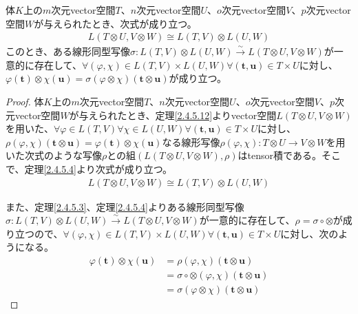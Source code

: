 \documentclass[dvipdfmx]{jsarticle}
\begin{document}
\begin{thm}\label{2.4.5.13}
体$K$上の$m$次元vector空間$T$、$n$次元vector空間$U$、$o$次元vector空間$V$、$p$次元vector空間$W$が与えられたとき、次式が成り立つ。
\begin{align*}
L(T \otimes U,V \otimes W) \cong L(T,V) \otimes L(U,W)
\end{align*}
このとき、ある線形同型写像$\sigma:L(T,V) \otimes L(U,W)\overset{\sim}{\rightarrow}L(T \otimes U,V \otimes W)$が一意的に存在して、$\forall(\varphi,\chi) \in L(T,V) \times L(U,W)\forall\left( \mathbf{t},\mathbf{u} \right) \in T \times U$に対し、$\varphi\left( \mathbf{t} \right) \otimes \chi\left( \mathbf{u} \right) = \sigma(\varphi \otimes \chi)\left( \mathbf{t} \otimes \mathbf{u} \right)$が成り立つ。
\end{thm}
\begin{proof}
体$K$上の$m$次元vector空間$T$、$n$次元vector空間$U$、$o$次元vector空間$V$、$p$次元vector空間$W$が与えられたとき、定理\ref{2.4.5.12}よりvector空間$L(T \otimes U,V \otimes W)$を用いた、$\forall\varphi \in L(T,V)\forall\chi \in L(U,W)\forall\left( \mathbf{t},\mathbf{u} \right) \in T \times U$に対し、$\rho(\varphi,\chi)\left( \mathbf{t} \otimes \mathbf{u} \right) = \varphi\left( \mathbf{t} \right) \otimes \chi\left( \mathbf{u} \right)$なる線形写像$\rho(\varphi,\chi):T \otimes U \rightarrow V \otimes W$を用いた次式のような写像$\rho$との組$\left( L(T \otimes U,V \otimes W),\rho \right)$はtensor積である。そこで、定理\ref{2.4.5.4}より次式が成り立つ。
\begin{align*}
L(T \otimes U,V \otimes W) \cong L(T,V) \otimes L(U,W)
\end{align*}\par
また、定理\ref{2.4.5.3}、定理\ref{2.4.5.4}よりある線形同型写像$\sigma:L(T,V) \otimes L(U,W)\overset{\sim}{\rightarrow}L(T \otimes U,V \otimes W)$が一意的に存在して、$\rho = \sigma \circ \otimes$が成り立つので、$\forall(\varphi,\chi) \in L(T,V) \times L(U,W)\forall\left( \mathbf{t},\mathbf{u} \right) \in T \times U$に対し、次のようになる。
\begin{align*}
\varphi\left( \mathbf{t} \right) \otimes \chi\left( \mathbf{u} \right) &= \rho(\varphi,\chi)\left( \mathbf{t} \otimes \mathbf{u} \right)\\
&= \sigma \circ \otimes (\varphi,\chi)\left( \mathbf{t} \otimes \mathbf{u} \right)\\
&= \sigma(\varphi \otimes \chi)\left( \mathbf{t} \otimes \mathbf{u} \right)
\end{align*}
\end{proof}
\end{document}

